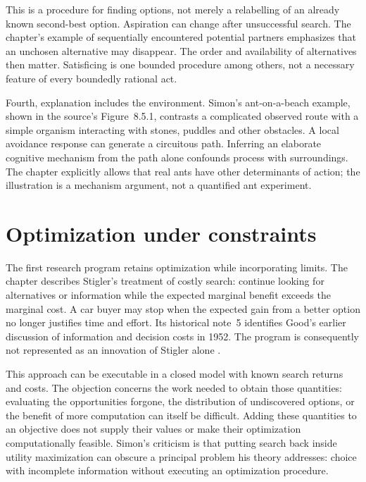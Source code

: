 This is a procedure for finding options, not merely a relabelling of an
already known second-best option. Aspiration can change after unsuccessful
search. The chapter's example of sequentially encountered potential
partners emphasizes that an unchosen alternative may disappear. The
order and availability of alternatives then matter. Satisficing is one
bounded procedure among others, not a necessary feature of every
boundedly rational act.

Fourth, explanation includes the environment. Simon's ant-on-a-beach
example, shown in the source's Figure~8.5.1, contrasts a complicated
observed route with a simple organism interacting with stones, puddles
and other obstacles. A local avoidance response can generate a circuitous
path. Inferring an elaborate cognitive mechanism from the path alone
confounds process with surroundings. The chapter explicitly allows that
real ants have other determinants of action; the illustration is a
mechanism argument, not a quantified ant experiment.

\section{Optimization under constraints}
\label{sec:p17-br-optimization}

The first research program retains optimization while incorporating limits.
The chapter describes Stigler's treatment of costly search: continue
looking for alternatives or information while the expected marginal
benefit exceeds the marginal cost. A car buyer may stop when the expected
gain from a better option no longer justifies time and effort. Its
historical note~5 identifies Good's earlier discussion of information
and decision costs in 1952. The program is consequently not represented
as an innovation of Stigler alone \cite[pp.~508--509, 513]{HertwigKozyreva2021Bounded}.

This approach can be executable in a closed model with known search
returns and costs. The objection concerns the work needed to obtain
those quantities: evaluating the opportunities forgone, the distribution
of undiscovered options, or the benefit of more computation can itself
be difficult. Adding these quantities to an objective does not supply
their values or make their optimization computationally feasible.
Simon's criticism is that putting search back inside utility maximization
can obscure a principal problem his theory addresses: choice with
incomplete information without executing an optimization procedure.

